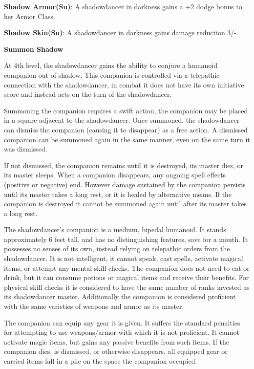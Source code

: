 \textbf{Shadow Armor(Su)}: A shadowdancer in darkness gains a +2 dodge bonus to her Armor Class.

\textbf{Shadow Skin(Su)}: A shadowdancer in darkness gains damage reduction 3/-.

\textbf{\large{Summon Shadow}}

At 4th level, the shadowdancer gains the ability to conjure a humanoid companion out of shadow. This companion is controlled via a telepathic connection with the shadowdancer, in combat it does not have its own initiative score and instead acts on the turn of the shadowdancer.  

Summoning the companion requires a swift action, the companion may be placed in a square adjacent to the shadowdancer. Once summoned, the shadowdancer can dismiss the companion (causing it to disappear) as a free action. A dismissed companion can be summoned again in the same manner, even on the same turn it was dismissed.

If not dismissed, the companion remains until it is destroyed, its master dies, or its master sleeps. When a companion disappears, any ongoing spell effects (positive or negative) end. However damage sustained by the companion persists until its master takes a long rest, or it is healed by alternative means. If the companion is destroyed it cannot be summoned again until after its master takes a long rest.

The shadowdancer's companion is a medium, bipedal humanoid. It stands approximately 6 feet tall, and has no distinguishing features, save for a mouth. It possesses no senses of its own, instead relying on telepathic orders from the shadowdancer. It is not intelligent, it cannot speak, cast spells, activate magical items, or attempt any mental skill checks. The companion does not need to eat or drink, but it can consume potions or magical items and receive their benefits. For physical skill checks it is considered to have the same number of ranks invested as its shadowdancer master. Additionally the companion is considered proficient with the same varieties of weapons and armor as its master.

The companion can equip any gear it is given. It suffers the standard penalties for attempting to use weapons/armor with which it is not proficient. It cannot activate magic items, but gains any passive benefits from such items. If the companion dies, is dismissed, or otherwise disappears, all equipped gear or carried items fall in a pile on the space the companion occupied. 

